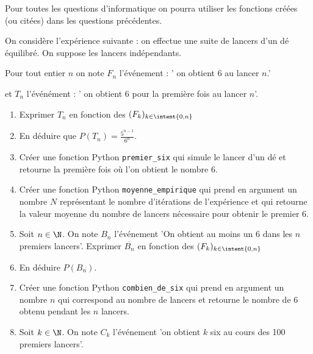 





\begin{exercice}
Pour toutes les questions d'informatique on pourra utiliser les fonctions créées (ou citées) dans les questions précédentes. 

On considère l'expérience suivante : on effectue une suite de lancers d'un dé  équilibré. On suppose les lancers indépendants. 

Pour tout entier $n$ on note $F_n $ l'événement 
: ' on obtient 6 au  lancer $n$.' 

et $T_n$ l'événément : ' on obtient 6 pour la première fois au lancer $n$'.

\begin{enumerate}
\item Exprimer $T_n$ en fonction des $(F_k)_{k\in \intent{0,n}}$
\item En déduire que $P(T_n) = \frac{5^{n-1} }{6^n}$. 
\item Créer une fonction Python \texttt{premier\_six} qui simule le lancer d'un dé et retourne la première fois où l'on obtient le nombre 6. 
\item Créer une fonction Python \texttt{moyenne\_empirique} qui prend en argument un nombre $N$ représentant le nombre d'itérations de l'expérience et qui retourne la valeur moyenne du nombre de lancers nécessaire pour obtenir le premier 6. 
\item Soit $n\in \N$. On note $B_n$ l'événement 'On obtient  au moins un 6 dans les $n$ premiers lancers'. Exprimer $\overline{B_n}$  en fonction des $(F_k)_{k\in \intent{0,n}}$
\item En déduire $P(B_n)$. 
\item Créer une fonction  Python \texttt{combien\_de\_six} qui prend en argument un nombre $n$ qui correspond au nombre de lancers et retourne le nombre de $6$ obtenu pendant les $n$ lancers. 

\item Soit $k\in \N$. On note $C_k$ l'événement 'on obtient $k$ six au cours des 100 premiers lancers'.


\end{enumerate}
\end{exercice}
